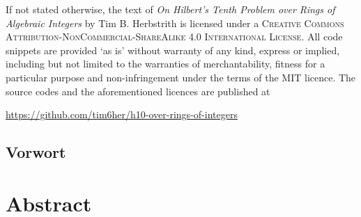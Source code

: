 \newpage%
\thispagestyle{empty}%
\vspace*{\fill}%
\noindent%
\begin{footnotesize}%
If not stated otherwise, the text of \emph{On Hilbert's Tenth Problem over Rings
of Algebraic Integers} by Tim B. Herbstrith is licensed under a \textsc{Creative
Commons Attribution-NonCommercial-ShareAlike 4.0 International License}. All
code snippets are provided `as is' without warranty of any kind, express or
implied, including but not limited to the warranties of merchantability, fitness
for a particular purpose and non-infringement under the terms of the
\textsc{MIT} licence. The source codes and the aforementioned licences are
published at
\begin{center}
 \url{https://github.com/tim6her/h10-over-rings-of-integers}
\end{center}
\end{footnotesize}
\cleardoublepage


\begin{german}
\section*{Vorwort}
\end{german}

\vspace{1.5cm}

\section*{Abstract}
\newpage
\thispagestyle{empty}
\tableofcontents
